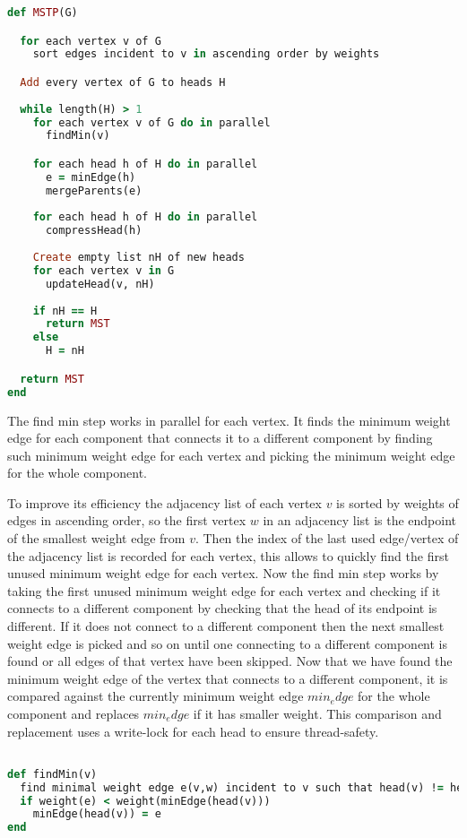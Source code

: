 \documentclass{report}
\theoremstyle{plain}
\theoremstyle{definition}
\theoremstyle{remark}
\begin{document}
\begin{lstlisting}[language=Ruby]
def MSTP(G)

  for each vertex v of G
    sort edges incident to v in ascending order by weights

  Add every vertex of G to heads H
  
  while length(H) > 1
    for each vertex v of G do in parallel
      findMin(v)

    for each head h of H do in parallel
      e = minEdge(h)
      mergeParents(e)
  
    for each head h of H do in parallel
      compressHead(h)
    
    Create empty list nH of new heads
    for each vertex v in G
      updateHead(v, nH)
    
    if nH == H
      return MST
    else
      H = nH

  return MST
end
\end{lstlisting}

The find min step works in parallel for each vertex. It finds the minimum weight edge for each component that connects it to a different component by finding such minimum weight edge for each vertex and picking the minimum weight edge for the whole component.

To improve its efficiency the adjacency list of each vertex $v$ is sorted by weights of edges in ascending order, so the first vertex $w$ in an adjacency list is the endpoint of the smallest weight edge from $v$. Then the index of the last used edge/vertex of the adjacency list is recorded for each vertex, this allows to quickly find the first unused minimum weight edge for each vertex. Now the find min step works by taking the first unused minimum weight edge for each vertex and checking if it connects to a different component by checking that the head of its endpoint is different. If it does not connect to a different component then the next smallest weight edge is picked and so on until one connecting to a different component is found or all edges of that vertex have been skipped. Now that we have found the minimum weight edge of the vertex that connects to a different component, it is compared against the currently minimum weight edge $min_edge$ for the whole component and replaces $min_edge$ if it has smaller weight. This comparison and replacement uses a write-lock for each head to ensure thread-safety. 

\begin{lstlisting}[language=Ruby]

def findMin(v)
  find minimal weight edge e(v,w) incident to v such that head(v) != head(w)
  if weight(e) < weight(minEdge(head(v)))
    minEdge(head(v)) = e
end
\end{lstlisting}
\end{document}
